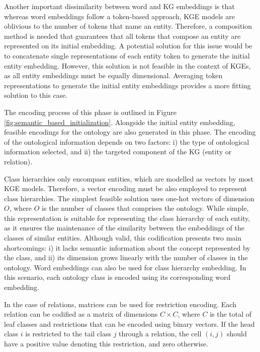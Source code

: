 Another important dissimilarity between word and KG embeddings is that whereas word embeddings follow a token-based approach, KGE models are oblivious to the number of tokens that name an entity. Therefore, a composition method is needed that guarantees that all tokens that compose an entity are represented on its initial embedding. A potential solution for this issue would be to concatenate single representations of each entity token to generate the initial entity embedding. However, this solution is not feasible in the context of KGEs, as all entity embeddings must be equally dimensional. Averaging token representations to generate the initial entity embeddings provides a more fitting solution to this case.

The encoding process of this phase is outlined in Figure \ref{fig:semantic_based_initialization}. Alongside the initial entity embedding, feasible encodings for the ontology are also generated in this phase. The encoding of the ontological information depends on two factors: i) the type of ontological information selected, and ii) the targeted component of the KG (entity or relation). 

Class hierarchies only encompass entities, which are modelled as vectors by most KGE models. Therefore, a vector encoding must be also employed to represent class hierarchies. The simplest feasible solution uses one-hot vectors of dimension $O$, where $O$ is the number of classes that comprises the ontology. While simple, this representation is suitable for representing the class hierarchy of each entity, as it ensures the maintenance of the similarity between the embeddings of the classes of similar entities. Although valid, this codification presents two main shortcomings: i) it lacks semantic information about the concept represented by the class, and ii) its dimension grows linearly with the number of classes in the ontology. Word embeddings can also be used for class hierarchy embedding. In this scenario, each ontology class is encoded using its corresponding word embedding.

In the case of relations, matrices can be used for restriction encoding. Each relation can be codified as a matrix of dimensions $C \times C$, where $C$ is the total of leaf classes and restrictions that can be encoded using binary vectors. If the head class $i$ is restricted to the tail class $j$ through a relation, the cell $(i,j)$ should have a positive value denoting this restriction, and zero otherwise.



